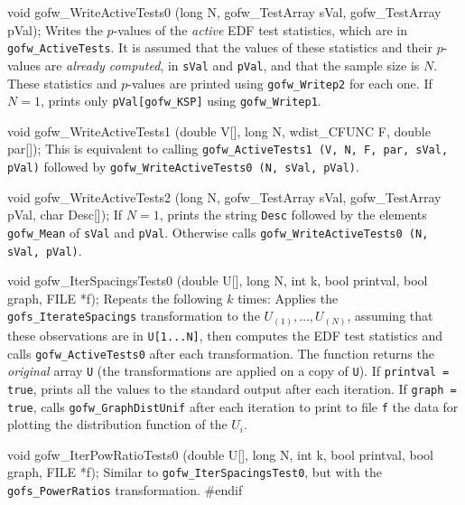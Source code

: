 void gofw_WriteActiveTests0 (long N, gofw_TestArray sVal,
                                     gofw_TestArray pVal);
\endcode
\tab  Writes the $p$-values of the {\em active\/} EDF test statistics,
  which are in {\tt gofw\_ActiveTests}.  It is assumed that the values
  of these statistics and their $p$-values are {\em already computed},
  in {\tt sVal} and {\tt pVal}, and that the sample size is $N$.
  These statistics and $p$-values are printed
  using {\tt gofw\_Writep2} for each one.
  If $N=1$, prints only {\tt pVal[gofw\_KSP]} using {\tt gofw\_Writep1}.
\endtab
\code


void gofw_WriteActiveTests1 (double V[], long N,
                             wdist_CFUNC F, double par[]);
\endcode
\tab This is equivalent to calling
 {\tt gofw\_ActiveTests1 (V, N, F, par, sVal, pVal)} followed by
 {\tt gofw\_WriteActiveTests0 (N, sVal, pVal)}.
\endtab
\code


void gofw_WriteActiveTests2 (long N, gofw_TestArray sVal,
                             gofw_TestArray pVal, char Desc[]);
\endcode
\tab If $N=1$, prints the string {\tt Desc} followed by the elements
  {\tt gofw\_Mean} of {\tt sVal} and {\tt pVal}. Otherwise calls
  {\tt gofw\_WriteActiveTests0 (N, sVal, pVal)}.
\endtab
\code


void gofw_IterSpacingsTests0 (double U[], long N, int k,
                              bool printval, bool graph, FILE *f);
\endcode
\tab Repeats the following $k$ times:
  Applies the {\tt gofs\_IterateSpacings} transformation to the
  $U_{(1)},\dots,U_{(N)}$, assuming that these observations are in
  {\tt U[1...N]}, then computes the EDF test statistics and calls
  {\tt gofw\_ActiveTests0} after each transformation.
  The function returns the {\em original\/} array {\tt U} (the
  transformations are applied on a copy of {\tt U}).
  If {\tt printval = true}, prints all the values to the standard output
  after each iteration.
  If {\tt graph = true}, calls {\tt gofw\_GraphDistUnif} after each iteration
  to print to file {\tt f} the data for plotting the distribution
  function of the $U_i$.
\endtab
\code


void gofw_IterPowRatioTests0 (double U[], long N, int k,
                              bool printval, bool graph, FILE *f);
\endcode
\tab  Similar to {\tt gofw\_IterSpacingsTest0}, but with the
  {\tt gofs\_PowerRatios} transformation.
\endtab
\code
\hide
#endif
\endhide
\endcode


